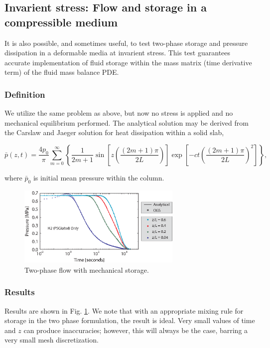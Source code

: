 \subsection{Invarient stress: Flow and storage in a compressible medium}

It is also possible, and sometimes useful, to test two-phase storage and pressure dissipation in a deformable media at invarient stress. This test guarantees accurate implementation of fluid storage within the mass matrix (time derivative term) of the fluid mass balance PDE. 

\subsubsection*{Definition}
We utilize the same problem as above, but now no stress is applied and no mechanical equilibrium performed. The analytical solution may be derived from the Carslaw and Jaeger \cite{Carslaw:59} solution for heat dissipation within a solid slab,

\begin{equation}
\bar{p}\left( z,t \right)=\frac{4{{p}_{0}}}{\pi }\sum\limits_{m=0}^{\infty }{\left\{ \frac{1}{2m+1}\sin \left[ z\left( \frac{\left( 2m+1 \right)\pi }{2L} \right) \right]\exp \left[ -ct{{\left( \frac{\left( 2m+1 \right)\pi }{2L} \right)}^{2}} \right] \right\}},
\end{equation}

where $\bar{p}_0$ is initial mean pressure within the column.

\begin{figure}[!b]
\begin{center}
\includegraphics[width=0.7\textwidth]{chapter_14/figures/fig_14_3_23}
\end{center}
\caption{Two-phase flow with mechanical storage.}
\label{terz:h2}
\end{figure}

\subsubsection*{Results}
Results are shown in Fig. \ref{terz:h2}. We note that with an appropriate mixing rule for storage in the two phase formulation, the result is ideal.  Very small values of time and $z$ can produce inaccuracies; however, this will always be the case, barring a very small mesh discretization.